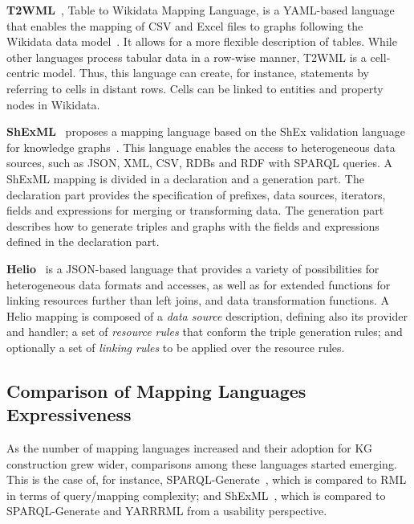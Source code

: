 \noindent\textbf{T2WML}~\parencite{szekely2019t2wml}, Table to Wikidata Mapping Language, is a YAML-based language that enables the mapping of CSV and Excel files to graphs following the Wikidata data model~\parencite{vrandevcic2014wikidata}. It allows for a more flexible description of tables. While other languages process tabular data in a row-wise manner, T2WML is a cell-centric model. Thus, this language can create, for instance, statements by referring to cells in distant rows. Cells can be linked to entities and property nodes in Wikidata.

\noindent\textbf{ShExML}~\parencite{Garcia-Gonzalez2020shexml,shexml} proposes a mapping language based on the ShEx validation language for knowledge graphs~\parencite{prud2014shex}. This language enables the access to heterogeneous data sources, such as JSON, XML, CSV, RDBs and RDF with SPARQL queries. A ShExML mapping is divided in a declaration and a generation part. The declaration part provides the specification of prefixes, data sources, iterators, fields and expressions for merging or transforming data. The generation part describes how to generate triples and graphs with the fields and expressions defined in the declaration part. 

\noindent\textbf{Helio}~\parencite{cimmino2022helio} is a JSON-based language that provides a variety of possibilities for heterogeneous data formats and accesses, as well as for extended functions for linking resources further than left joins, and data transformation functions. A Helio mapping is composed of a \textit{data source} description, defining also its provider and handler; a set of \textit{resource rules} that conform the triple generation rules; and optionally a set of \textit{linking rules} to be applied over the resource rules. 








\subsection{Comparison of Mapping Languages Expressiveness}
\label{sec:chp2_language-comparison}

As the number of mapping languages increased and their adoption for KG construction grew wider, comparisons among these languages started emerging. This is the case of, for instance, SPARQL-Generate~\parencite{Lefrancois2017sparqlgenerate}, which is compared to RML in terms of query/mapping complexity; and ShExML~\parencite{Garcia-Gonzalez2020shexml}, which is compared to SPARQL-Generate and YARRRML from a usability perspective.

